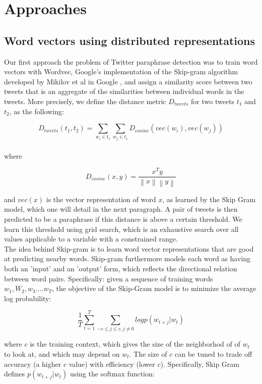 \documentclass[conference]{IEEEtran}
\begin{document}
 \section{Approaches}

\subsection{Word vectors using distributed representations}
Our first approach the problem of Twitter paraphrase detection was to train word vectors with Wordvec, Google's implementation of the Skip-gram algorithm developed by Mikilov et al in Google \cite{Mikolov}, and assign a similarity score between two tweets that is an aggregate of the similarities between individual words in the tweets.  More precisely, we define the distance metric $D_{tweets}$ for two tweets $t_1$ and $t_2$, as the following:

$$D_{tweets}(t_1, t_2) = \sum_{w_i \in t_1} \sum_{w_j \in t_1} D_{cosine}(vec(w_i), vec(w_j))$$\\

where

$$D_{cosine}(x, y) = \frac{x^Ty}{\left \| x \right \| \left \|y \right \|}$$

and $vec(x)$ is the vector representation of word $x$, as learned by the Skip Gram model, which one will detail in the next paragraph.  A pair of tweets is then predicted to be a paraphrase if this distance is above a certain threshold.  We learn this threshold using grid search, which is an exhaustive search over all values applicable to a variable with a constrained range.\\

\indent The idea behind Skip-gram is to learn word vector representations that are good at predicting nearby words.  Skip-gram furthermore models each word as having both an 'input' and an 'output' form, which reflects the directional relation between word pairs.  Specifically: given a sequence of training words $w_1, W_2, w_3 .... w_T$, the objective of the Skip-Gram model is to minimize the average log probability:

$$\frac{1}{T} \sum_{t=1}^T \sum_{-c \leq j \leq c, j \neq 0} logp(w_{t+j}|w_t)$$

where $c$ is the training context, which gives the size of the neighborhod of of $w_t$ to look at, and which may depend on $w_t$. The size of $c$ can be tuned to trade off accuracy (a higher $c$ value) with efficiency (lower $c$). Specifically, Skip Gram defines $p(w_{t+j}|w_t)$ using the softmax function:
\end{document}
